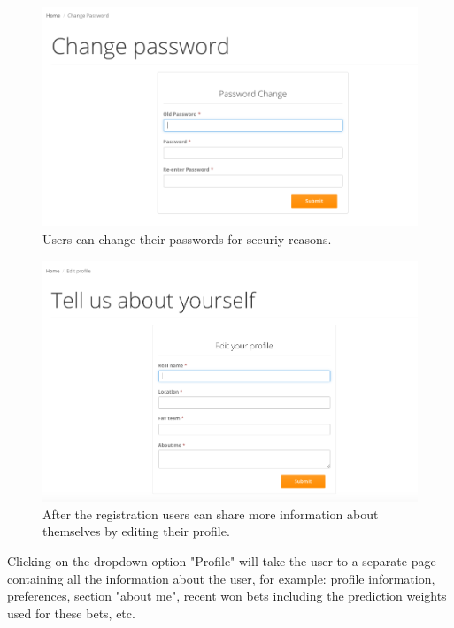 \begin{figure}[H]
	\begin{center}
		\includegraphics[width=.90\columnwidth]{impl/images/changePassword}
		\caption{Users can change their passwords for securiy reasons.} \label{fig:changePassword}
	\end{center}
\end{figure}

\begin{figure}[H]
	\begin{center}
		\includegraphics[width=.90\columnwidth]{impl/images/editProfile}
		\caption{After the registration users can share more information about themselves by editing their profile.} \label{fig:editprofile}
	\end{center}
\end{figure}

Clicking on the dropdown option "Profile" will take the user to a separate page containing all the information about the user, for example: profile information, preferences, section "about me", recent won bets including the prediction weights used for these bets, etc. 

